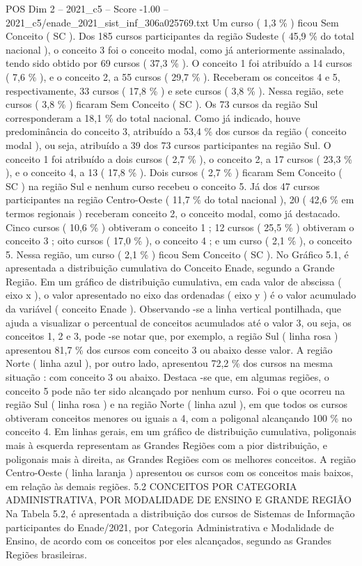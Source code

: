 \begin{textsample}{POS Dim 2 – 2021\_c5 – Score -1.00 – 2021\_c5/enade\_2021\_sist\_inf\_306a025769.txt}
Um curso ( 1,3 \% ) ficou Sem Conceito ( SC ).
Dos 185 cursos participantes da região Sudeste ( 45,9 \% do total nacional ), o conceito 3 foi o conceito modal, como já anteriormente assinalado, tendo sido obtido por 69 cursos ( 37,3 \% ).
O conceito 1 foi atribuído a 14 cursos ( 7,6 \% ), e o conceito 2, a 55 cursos ( 29,7 \% ).
Receberam os conceitos 4 e 5, respectivamente, 33 cursos ( 17,8 \% ) e sete cursos ( 3,8 \% ).
Nessa região, sete cursos ( 3,8 \% ) ficaram Sem Conceito ( SC ).
Os 73 cursos da região Sul corresponderam a 18,1 \% do total nacional.
Como já indicado, houve predominância do conceito 3, atribuído a 53,4 \% dos cursos da região ( conceito modal ), ou seja, atribuído a 39 dos 73 cursos participantes na região Sul.
O conceito 1 foi atribuído a dois cursos ( 2,7 \% ), o conceito 2, a 17 cursos ( 23,3 \% ), e o conceito 4, a 13 ( 17,8 \% ).
Dois cursos ( 2,7 \% ) ficaram Sem Conceito ( SC ) na região Sul e nenhum curso recebeu o conceito 5.
Já dos 47 cursos participantes na região Centro-Oeste ( 11,7 \% do total nacional ), 20 ( 42,6 \% em termos regionais ) receberam conceito 2, o conceito modal, como já destacado.
Cinco cursos ( 10,6 \% ) obtiveram o conceito 1 ; 12 cursos ( 25,5 \% ) obtiveram o conceito 3 ; oito cursos ( 17,0 \% ), o conceito 4 ; e um curso ( 2,1 \% ), o conceito 5.
Nessa região, um curso ( 2,1 \% ) ficou Sem Conceito ( SC ).
No Gráfico 5.1, é apresentada a distribuição cumulativa do Conceito Enade, segundo a Grande Região.
Em um gráfico de distribuição cumulativa, em cada valor de abscissa ( eixo x ), o valor apresentado no eixo das ordenadas ( eixo y ) é o valor acumulado da variável ( conceito Enade ).
Observando -se a linha vertical pontilhada, que ajuda a visualizar o percentual de conceitos acumulados até o valor 3, ou seja, os conceitos 1, 2 e 3, pode -se notar que, por exemplo, a região Sul ( linha rosa ) apresentou 81,7 \% dos cursos com conceito 3 ou abaixo desse valor.
A região Norte ( linha azul ), por outro lado, apresentou 72,2 \% dos cursos na mesma situação : com conceito 3 ou abaixo.
Destaca -se que, em algumas regiões, o conceito 5 pode não ter sido alcançado por nenhum curso.
Foi o que ocorreu na região Sul ( linha rosa ) e na região Norte ( linha azul ), em que todos os cursos obtiveram conceitos menores ou iguais a 4, com a poligonal alcançando 100 \% no conceito 4.
Em linhas gerais, em um gráfico de distribuição cumulativa, poligonais mais à esquerda representam as Grandes Regiões com a pior distribuição, e poligonais mais à direita, as Grandes Regiões com os melhores conceitos.
A região Centro-Oeste ( linha laranja ) apresentou os cursos com os conceitos mais baixos, em relação às demais regiões. 5.2 CONCEITOS POR CATEGORIA ADMINISTRATIVA, POR MODALIDADE DE ENSINO E GRANDE REGIÃO Na Tabela 5.2, é apresentada a distribuição dos cursos de Sistemas de Informação participantes do Enade/2021, por Categoria Administrativa e Modalidade de Ensino, de acordo com os conceitos por eles alcançados, segundo as Grandes Regiões brasileiras.

\end{textsample}
